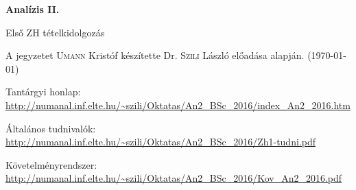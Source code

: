 \documentclass[a4paper,11.5pt]{article}
\begin{document}
	\setlength\parindent{0pt}
	\def\s{\hspace{0.2mm}\vphantom{\beta}}
	\def\Z{\mathbb{Z}}
	\def\Q{\mathbb{Q}}
	\def\R{\mathbb{R}}
	\def\C{\mathbb{C}}
	\def\N{\mathbb{N}}
	\def\Ra{\overline{\mathbb{R}}}
	
	\def\sume{\displaystyle\sum_{n=1}^{+\infty}}
	\def\sumn{\displaystyle\sum_{n=0}^{+\infty}}
	
	\def\narrow{\underset{n\rightarrow+\infty}{\longrightarrow}}
	\def\limn{\displaystyle\lim_{n\to +\infty}}
	\def\limx{\displaystyle\lim_{x\to +\infty}}
	
	
	\theoremstyle{definition}
	\newtheorem{theorem}{Tétel}[subsection] 
	
	\theoremstyle{definition}
	\newtheorem{definition}[theorem]{Definíció} 
	\newtheorem{example}[theorem]{Példa} 
	\newtheorem{task}[theorem]{Feladat} 
	\newtheorem{note}[theorem]{Megjegyzés}
	\newtheorem{revision}[theorem]{Emlékeztető}
	\begin{center}
		{\LARGE\textbf{Analízis II.}}
		
		{\Large Első ZH tételkidolgozás}
		
	\end{center}
	A jegyzetet \textsc{Umann} Kristóf készítette Dr. \textsc{Szili} László  előadása alapján. (\today)
	\bigskip
	
	Tantárgyi honlap: \url{http://numanal.inf.elte.hu/~szili/Oktatas/An2_BSc_2016/index_An2_2016.htm}
	
	Általános tudnivalók: \url{http://numanal.inf.elte.hu/~szili/Oktatas/An2_BSc_2016/Zh1-tudni.pdf}
	
	Követelményrendszer: \url{http://numanal.inf.elte.hu/~szili/Oktatas/An2_BSc_2016/Kov_An2_2016.pdf}
	
\end{document}
